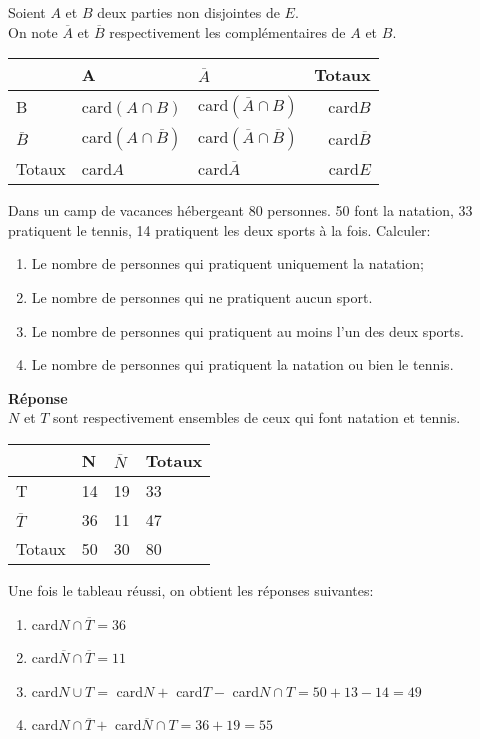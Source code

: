  Soient $ A$ et $B $ deux parties  non disjointes de $ E $.\\
On note $\overline{A} $ et  $\overline{B} $ respectivement les complémentaires de $ A$ et $B $.

\begin{center}
\renewcommand{\arraystretch}{1.5}

\begin{tabularx}{\textwidth}{|l|X|X|r|}
\cline{2-4}
\multicolumn{1}{c|}{} & A & $ \overline{A}$ & Totaux \\
\hline
B & card$( A\cap  B )$ & card$( \overline{A}  \cap B)$& card$ B $\\
\hline
$ \overline{B} $&  card$( A\cap \overline{B})$  & card$( \overline{A}\cap  \overline{B} )$  & card$\overline{B}$\\
\hline 
Totaux &card$ A$&card$\overline{A}$& card$ E $\\
\hline
\end{tabularx}
\end{center}
\begin{exercice}
Dans un camp de vacances hébergeant 80 personnes. 50 font la natation, 33 pratiquent le tennis, 14 pratiquent les deux sports à la fois. Calculer:
\begin{enumerate}
\item Le nombre de personnes qui pratiquent uniquement la natation;
\item Le nombre de personnes qui ne pratiquent aucun sport.
\item Le nombre de personnes qui pratiquent au moins l'un des deux sports.
\item  Le nombre de personnes qui pratiquent la natation ou bien le tennis.
\end{enumerate}
\end{exercice}
\textbf{Réponse}\\
$ N$ et $T $ sont respectivement ensembles de ceux qui font natation et tennis.

\renewcommand{\arraystretch}{1.5}
\begin{tabularx}{\textwidth}{|l|X|X|X|}
\cline{2-4}
\multicolumn{1}{c|}{} & N & $ \overline{N}$ & Totaux \\
\hline
T & 14 & 19& 33\\
\hline
$ \overline{T} $&  36 &  11 & 47 \\
\hline 
Totaux & 50&  30 &   80\\
\hline
\end{tabularx}

Une fois le tableau réussi, on obtient les réponses suivantes:
\begin{enumerate}
\item card$ N\cap \overline{T} =36$
\item card$ \overline{N} \cap \overline{T}=11 $
\item card$ N \cup T =$ card$ N + $ card$ T -$ card$ N \cap T = 50+13-14=49$
\item card$ N\cap \overline{T} +$ card$ \overline{N}\cap T= 36+19=55 $
\end{enumerate}

